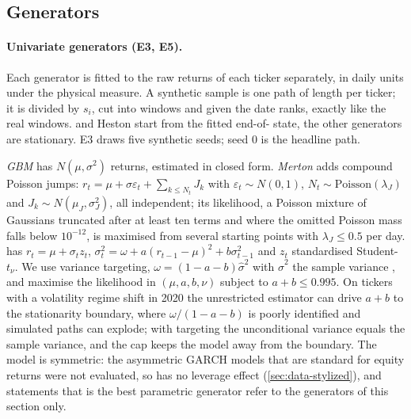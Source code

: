 \subsection{Generators}\label{sec:data-generators}

\paragraph{Univariate generators (E3, E5).}
Each generator is fitted to the raw \TRAIN{} returns of each ticker separately, in daily units
under the physical measure. A synthetic sample is one path of \TEST{} length per ticker; it is
divided by $s_i$, cut into windows and given the \TEST{} date ranks, exactly like the real
\TEST{} windows. \GARCHt{} and Heston start from the fitted end-of-\TRAIN{} state, the other
generators are stationary. E3 draws five synthetic seeds; seed 0 is the headline path.

\emph{GBM} has \iid{} $N(\mu,\sigma^2)$ returns, estimated in closed form. \emph{Merton}
\citep{merton1976option} adds compound Poisson jumps: $r_t=\mu+\sigma\varepsilon_t+\sum_{k\le
N_t}J_k$ with $\varepsilon_t\sim N(0,1)$, $N_t\sim\mathrm{Poisson}(\lambda_J)$ and
$J_k\sim N(\mu_J,\sigma_J^2)$, all independent; its likelihood, a Poisson mixture of Gaussians
truncated after at least ten terms and where the omitted Poisson mass falls below $10^{-12}$, is
maximised from several starting points with $\lambda_J\le0.5$ per day. \emph{\GARCHt{}}
\citep{bollerslev1986generalized,bollerslev1987conditionally} has $r_t=\mu+\sigma_tz_t$,
$\sigma_t^2=\omega+a(r_{t-1}-\mu)^2+b\sigma_{t-1}^2$ and $z_t$ \iid{} standardised
Student-$t_\nu$. We use variance targeting, $\omega=(1-a-b)\hat\sigma^2$ with $\hat\sigma^2$ the
\TRAIN{} sample variance \citep{engle_1996_garch,francq_2011_merits}, and maximise the likelihood
in $(\mu,a,b,\nu)$ subject to $a+b\le0.995$. On tickers with a volatility regime shift in 2020
the unrestricted estimator can drive $a+b$ to the stationarity boundary, where
$\omega/(1-a-b)$ is poorly identified and simulated paths can explode; with targeting the
unconditional variance equals the sample variance, and the cap keeps the model away from the
boundary. The model is symmetric: the asymmetric GARCH models that are standard for equity
returns \citep{nelson_1991_conditional,glosten_1993_relation} were not evaluated, so \GARCHt{}
has no leverage effect (\cref{sec:data-stylized}), and statements that \GARCHt{} is the best
parametric generator refer to the generators of this section only.

